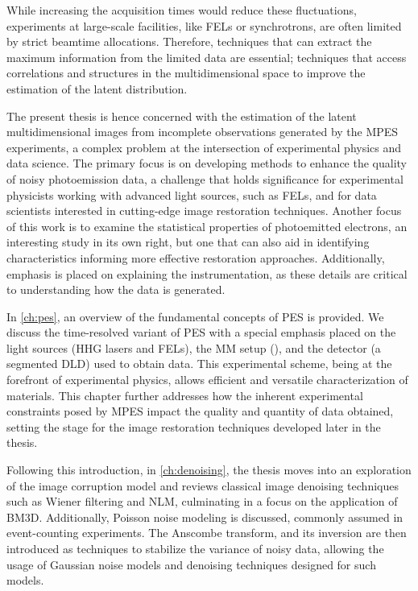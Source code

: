 While increasing the acquisition times would reduce these fluctuations, experiments at large-scale facilities, like \glspl{FEL} or synchrotrons, are often limited by strict \gls{beamtime} allocations. Therefore, techniques that can extract the maximum information from the limited data are essential; techniques that access correlations and structures in the multidimensional space to improve the estimation of the latent distribution.

The present thesis is hence concerned with the estimation of the latent multidimensional images from incomplete observations generated by the \gls{MPES} experiments, a complex problem at the intersection of experimental physics and data science. The primary focus is on developing methods to enhance the quality of noisy photoemission data, a challenge that holds significance for experimental physicists working with advanced light sources, such as \glspl{FEL}, and for data scientists interested in cutting-edge image restoration techniques. Another focus of this work is to examine the statistical properties of photoemitted electrons, an interesting study in its own right, but one that can also aid in identifying characteristics informing more effective restoration approaches. Additionally, emphasis is placed on explaining the instrumentation, as these details are critical to understanding how the data is generated.

In \cref{ch:pes}, an overview of the fundamental concepts of \gls{PES} is provided. We discuss the time-resolved variant of \gls{PES} with a special emphasis placed on the light sources (HHG lasers and \glspl{FEL}), the \gls{MM} setup (), and the detector (a segmented \gls{DLD}) used to obtain data. This experimental scheme, being at the forefront of experimental physics, allows efficient and versatile characterization of materials. This chapter further addresses how the inherent experimental constraints posed by \gls{MPES} impact the quality and quantity of data obtained, setting the stage for the image restoration techniques developed later in the thesis.

Following this introduction, in \cref{ch:denoising}, the thesis moves into an exploration of the image corruption model and reviews  classical image denoising techniques such as Wiener filtering and \gls{NLM}, culminating in a focus on the application of \gls{BM3D}. Additionally, Poisson noise modeling is discussed, commonly assumed in event-counting experiments. The Anscombe transform, and its inversion are then introduced as techniques to stabilize the variance of noisy data, allowing the usage of Gaussian noise models and denoising techniques designed for such models.

